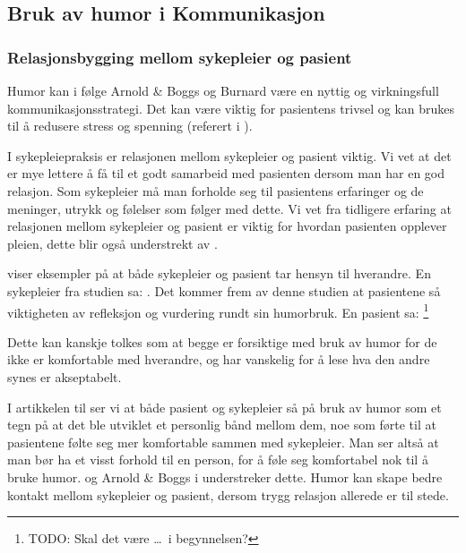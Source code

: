 \subsection{Bruk av humor i Kommunikasjon}

\subsubsection{Relasjonsbygging mellom sykepleier og pasient}
\label{disk.relbygg}

Humor kan i følge Arnold \&{} Boggs og Burnard være en nyttig og virkningsfull
kommunikasjonsstrategi. Det kan være viktig for pasientens trivsel og kan
brukes til å redusere stress og spenning (referert i ).

I sykepleiepraksis er relasjonen mellom sykepleier og pasient viktig. Vi vet at
det er mye lettere å få til et godt samarbeid med pasienten dersom man har en
god relasjon. Som sykepleier må man forholde seg til pasientens erfaringer og
de meninger, utrykk og følelser som følger med dette. Vi vet fra tidligere
erfaring at relasjonen mellom sykepleier og pasient er viktig for hvordan
pasienten opplever pleien, dette blir også understrekt av .

 viser eksempler på at både sykepleier og pasient tar hensyn
til hverandre. En sykepleier fra studien sa:
. Det kommer frem av denne studien at pasientene så viktigheten av
refleksjon og vurdering rundt sin humorbruk. En pasient sa:
\footnote{TODO:
Skal det være \ldots\ i begynnelsen?}

Dette kan kanskje tolkes som at begge er forsiktige med bruk av humor for de
ikke er komfortable med hverandre, og har vanskelig for å lese hva den andre
synes er akseptabelt.

I artikkelen til  ser vi at både pasient og sykepleier så på
bruk av humor som et tegn på at det ble utviklet et personlig bånd mellom dem,
noe som førte til at pasientene følte seg mer komfortable sammen med
sykepleier. Man ser altså at man bør ha et visst forhold til en person, for å
føle seg komfortabel nok til å bruke humor.  og Arnold
\&{} Boggs i  understreker dette. Humor kan skape bedre kontakt
mellom sykepleier og pasient, dersom trygg relasjon allerede er til stede.


